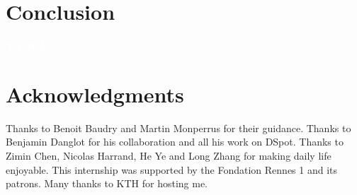 \documentclass[11pt]{sdm_internship}
\newcommand{\todo}[1]{\colorbox{Red!75}{\textcolor{white}{\textbf{TODO\ifx&#1&\else: #1\fi}}}}
\newcommand{\dspot}{DSpot\xspace}
\begin{document}
\section*{Conclusion}%
\label{sec:conclu}%
\todo{}


\section*{Acknowledgments}%
\label{sec:ack}%
Thanks to Benoit Baudry and Martin Monperrus for their guidance.
Thanks to Benjamin Danglot for his collaboration and all his work on \dspot.
Thanks to Zimin Chen, Nicolas Harrand, He Ye and Long Zhang for making daily life enjoyable.
This internship was supported by the Fondation Rennes 1 and its patrons.
Many thanks to KTH for hosting me.


%
%
\label{sec:ref}%
\end{document}
